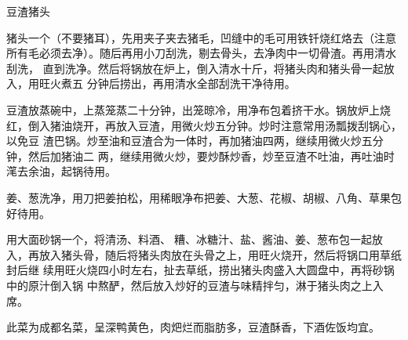 \begin{recipe}{豆渣猪头}

\ingredients


\preparation

\step 猪头一个（不要猪耳），先用夹子夹去猪毛，凹缝中的毛可用铁钎烧红烙去（注意
所有毛必须去净）。随后再用小刀刮洗，剔去骨头，去净肉中一切骨渣。再用清水刮洗，
直到洗净。然后将锅放在炉上，倒入清水十斤，将猪头肉和猪头骨一起放入，用旺火煮五
分钟后捞出，再用清水全部刮洗干净待用。

\step 豆渣放蒸碗中，上蒸笼蒸二十分钟，出笼晾冷，用净布包着挤干水。锅放炉上烧
红，倒入猪油烧开，再放入豆渣，用微火炒五分钟。炒时注意常用汤瓢拨刮锅心，以免豆
渣巴锅。炒至油和豆渣合为一体时，再加猪油四两，继续用微火炒五分钟，然后加猪油二
两，继续用微火炒，要炒酥炒香，炒至豆渣不吐油，再吐油时滗去余油，起锅待用。

\step 姜、葱洗净，用刀把姜拍松，用稀眼净布把姜、大葱、花椒、胡椒、八角、草果包
好待用。

\step 用大面砂锅一个，将清汤、料酒、𰪿糟、冰糖汁、盐、酱油、姜、葱布包一起放
入，再放入猪头骨，随后将猪头肉放在头骨之上，用旺火烧开，然后将锅口用草纸封后继
续用旺火烧四小时左右，扯去草纸，捞出猪头肉盛入大圆盘中，再将砂锅中的原汁倒入锅
中熬酽，然后放入炒好的豆渣与味精拌匀，淋于猪头肉之上入席。

\features

此菜为成都名菜，呈深鸭黄色，肉𤆵烂而脂肪多，豆渣酥香，下酒佐饭均宜。

\end{recipe}

